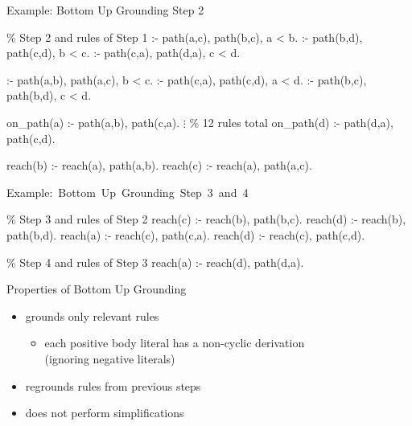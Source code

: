 \begin{frame}[fragile]{Example: Bottom Up Grounding Step 2}
  \vfill
\begin{SemiVerbatim}[\small]{.9}
{\color{comment}\% Step 2 \alert{and} rules of Step 1}
:- \alert{path(a,c)}, \alert{path(b,c)}, a < b.
:- \alert{path(b,d)}, \alert{path(c,d)}, b < c.
:- \alert{path(c,a)}, \alert{path(d,a)}, c < d.

:- \alert{path(a,b)}, \alert{path(a,c)}, b < c.
:- \alert{path(c,a)}, \alert{path(c,d)}, a < d.
:- \alert{path(b,c)}, \alert{path(b,d)}, c < d.

on_path(a) :- \alert{path(a,b)}, \alert{path(c,a)}.
           \(\vdots\) {\color{comment}\% 12 rules total}
on_path(d) :- \alert{path(d,a)}, \alert{path(c,d)}.

reach(b) :- \alert{reach(a)}, \alert{path(a,b)}.
reach(c) :- \alert{reach(a)}, \alert{path(a,c)}.
\end{SemiVerbatim}
\end{frame}

\begin{frame}[fragile]{\mbox{Example: Bottom Up Grounding Step 3 and 4}}
  \vfill
\begin{SemiVerbatim}{.9}
{\color{comment}\% Step 3 \alert{and} rules of Step 2}
reach(c) :- \alert{reach(b)}, path(b,c).
reach(d) :- \alert{reach(b)}, path(b,d).
reach(a) :- \alert{reach(c)}, path(c,a).
reach(d) :- \alert{reach(c)}, path(c,d).

{\color{comment}\% Step 4 \alert{and} rules of Step 3}
reach(a) :- \alert{reach(d)}, path(d,a).
\end{SemiVerbatim}
\end{frame}

\begin{frame}{Properties of Bottom Up Grounding}
  \vfill
  \begin{itemize}
    \item grounds only \alert{relevant} rules
      \begin{itemize}
        \item each positive body literal has a non-cyclic derivation \\
              (ignoring negative literals)
      \end{itemize}
    \item \alert{regrounds} rules from previous steps
  \end{itemize}
  \begin{itemize}
    \item does not perform \alert{simplifications}
  \end{itemize}
\end{frame}


